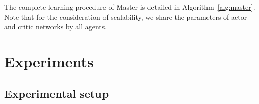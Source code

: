 \documentclass[sigconf]{acmart}
\newcommand{\stddpg}{{\sc Master}\xspace}
\begin{document}
The complete learning procedure of \stddpg is detailed in Algorithm~\ref{alg:master}. 
Note that for the consideration of scalability, we share the parameters of actor and critic networks by all agents.


\section{Experiments}\label{sec:exp}
\subsection{Experimental setup}
\end{document}
